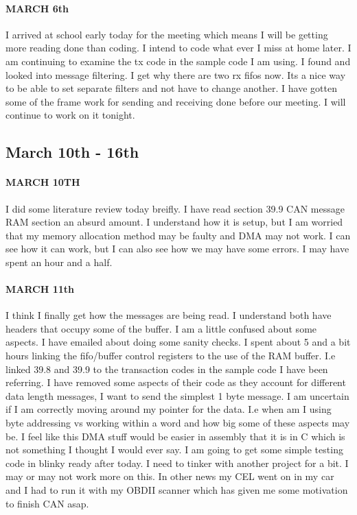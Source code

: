\documentclass{article}
\begin{document}
\paragraph{MARCH 6th} I arrived at school early today for the meeting which means I will be getting more reading done than coding. I intend to code what ever I miss at home later.  I am continuing to examine the tx code in the sample code I am using. I found and looked into message filtering. I get why there are two rx fifos now. Its a nice way to be able to set separate filters and not have to change another. I have gotten some of the frame work for sending and receiving done before our meeting. I will continue to work on it tonight.
\subsection{March 10th - 16th}
\paragraph{MARCH 10TH} I did some literature review today breifly. I have read section 39.9 CAN message RAM section an absurd amount. I understand how it is setup, but I am worried that my memory allocation method may be faulty and DMA may not work. I can see how it can work, but I can also see how we may have some errors. I may have spent an hour and a half. 
\paragraph{MARCH 11th} I think I finally get how the messages are being read. I understand both have headers that occupy some of the buffer. I am a little confused about some aspects. I have emailed about doing some sanity checks. I spent about 5 and a bit hours linking the fifo/buffer control registers to the use of the RAM buffer. I.e linked 39.8 and 39.9 to the transaction codes in the sample code I have been referring. I have removed some aspects of their code as they account for different data length messages, I want to send the simplest 1 byte message. I am uncertain if I am correctly moving around my pointer for the data. I.e when am I using byte addressing vs working within a word and how big some of these aspects may be. I feel like this DMA stuff would be easier in assembly that it is in C which is not something I thought I would ever say.  I am going to get some simple testing code in blinky ready after today. I need to tinker with another project for a bit. I may or may not work more on this. In other news my CEL went on in my car and I had to run it with my OBDII scanner which has given me some motivation to finish CAN asap.
\end{document}
